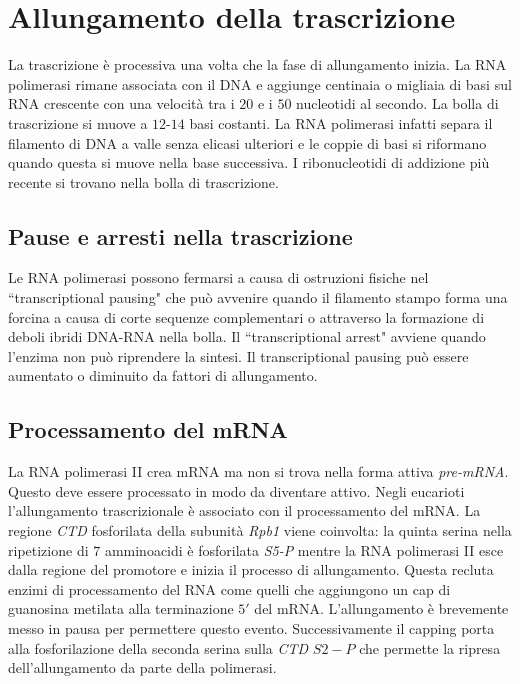 \section{Allungamento della trascrizione}
La trascrizione \`e processiva una volta che la fase di allungamento inizia. La RNA polimerasi rimane associata con il DNA e aggiunge centinaia o migliaia di basi sul RNA crescente 
con una velocit\`a tra i $20$ e i $50$ nucleotidi al secondo. La bolla di trascrizione si muove a $12$-$14$ basi costanti. La RNA polimerasi infatti separa il filamento di DNA 
a valle senza elicasi ulteriori e le coppie di basi si riformano quando questa si muove nella base successiva. I ribonucleotidi di addizione pi\`u recente si trovano nella bolla di 
trascrizione. 
\subsection{Pause e arresti nella trascrizione}
Le RNA polimerasi possono fermarsi a causa di ostruzioni fisiche nel ``transcriptional pausing" che pu\`o avvenire quando il filamento stampo forma una forcina a causa di corte sequenze
complementari o attraverso la formazione di deboli ibridi DNA-RNA nella bolla. Il ``transcriptional arrest" avviene quando l'enzima non pu\`o riprendere la sintesi. Il transcriptional
pausing pu\`o essere aumentato o diminuito da fattori di allungamento.
\subsection{Processamento del mRNA}
La RNA polimerasi II crea mRNA ma non si trova nella forma attiva \emph{pre-mRNA}. Questo deve essere processato in modo da diventare attivo. Negli eucarioti l'allungamento trascrizionale
\`e associato con il processamento del mRNA. La regione \emph{CTD} fosforilata della subunit\`a \emph{Rpb1} viene coinvolta: la quinta serina nella ripetizione di $7$ amminoacidi \`e 
fosforilata \emph{S5-P} mentre la RNA polimerasi II esce dalla regione del promotore e inizia il processo di allungamento. Questa recluta enzimi di processamento del RNA come
quelli che aggiungono un cap di guanosina metilata alla terminazione $5'$ del mRNA. L'allungamento \`e brevemente messo in pausa per permettere questo evento. Successivamente il capping
porta alla fosforilazione della seconda serina sulla \emph{CTD} $S2-P$ che permette la ripresa dell'allungamento da parte della polimerasi. 
